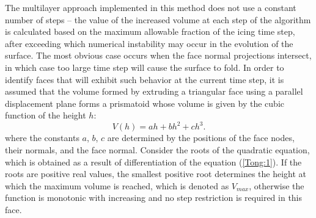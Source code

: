 \documentclass[
11pt,%
tightenlines,%
twoside,%
onecolumn,%
nofloats,%
nobibnotes,%
nofootinbib,%
superscriptaddress,%
noshowpacs,%
centertags]%
{revtex4-2}
\begin{document}
The multilayer approach implemented in this method does not use a constant number of steps -- the value of the increased volume at each step of the algorithm is calculated based on the maximum allowable fraction of the icing time step, after exceeding which numerical instability may occur in the evolution of the surface.
The most obvious case occurs when the face normal projections intersect, in which case too large time step will cause the surface to fold.
In order to  identify faces that will exhibit such behavior at the
current time step, it is assumed that the volume formed by extruding
a triangular face using a parallel displacement plane forms a
prismatoid whose volume is given by the cubic function of the height
$h$:
\begin{equation}\label{Tong:1}
V(h)=ah+bh^2+ch^3.
\end{equation}
where the constants $a$, $b$, $c$ are determined by the  positions
of the face nodes, their normals, and the face normal.
Consider the roots of the quadratic equation, which is obtained as a result of differentiation of the equation (\ref{Tong:1}).
If the roots are positive real values, the smallest positive root determines the height at which the maximum volume is reached, which is denoted as $V_{max}$, otherwise the function is monotonic with increasing and no step restriction is required in this face.
\end{document}
